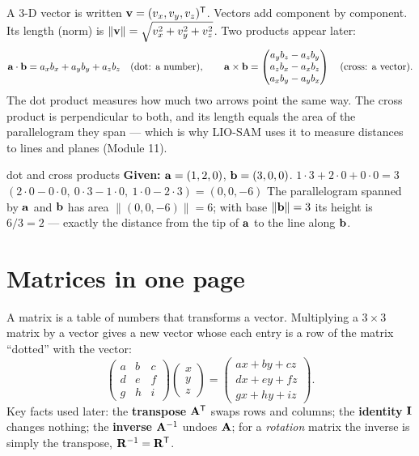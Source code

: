 \begin{eng}
A 3-D vector is written $\mathbf{v}=(v_x,v_y,v_z)^\mathsf{T}$. Vectors add component by component. Its length (norm) is $\|\mathbf{v}\|=\sqrt{v_x^2+v_y^2+v_z^2}$. Two products appear later:
\[ \mathbf{a}\cdot\mathbf{b}=a_xb_x+a_yb_y+a_zb_z \quad(\text{dot: a number}),\qquad
\mathbf{a}\times\mathbf{b}=\begin{pmatrix}a_yb_z-a_zb_y\\ a_zb_x-a_xb_z\\ a_xb_y-a_yb_x\end{pmatrix}\quad(\text{cross: a vector}). \]
The dot product measures how much two arrows point the same way. The cross product is perpendicular to both, and its length equals the area of the parallelogram they span --- which is why LIO-SAM uses it to measure distances to lines and planes (Module 11).
\end{eng}

\begin{worked}{dot and cross products}
\textbf{Given:} $\mathbf{a}=(1,2,0)$, $\mathbf{b}=(3,0,0)$.
 $1\cdot3+2\cdot0+0\cdot0 = 3$
 $(2\cdot0-0\cdot0,\ 0\cdot3-1\cdot0,\ 1\cdot0-2\cdot3)=(0,0,-6)$
 The parallelogram spanned by $\mathbf{a}$ and $\mathbf{b}$ has area $\|(0,0,-6)\|=6$; with base $\|\mathbf{b}\|=3$ its height is $6/3=2$ --- exactly the distance from the tip of $\mathbf{a}$ to the line along $\mathbf{b}$.
\end{worked}

\section{Matrices in one page}
\begin{eng}
A matrix is a table of numbers that transforms a vector. Multiplying a $3\times3$ matrix by a vector gives a new vector whose each entry is a row of the matrix ``dotted'' with the vector:
\[\begin{pmatrix}a&b&c\\d&e&f\\g&h&i\end{pmatrix}\begin{pmatrix}x\\y\\z\end{pmatrix}=\begin{pmatrix}ax+by+cz\\dx+ey+fz\\gx+hy+iz\end{pmatrix}.\]
Key facts used later: the \textbf{transpose} $\mathbf{A}^\mathsf{T}$ swaps rows and columns; the \textbf{identity} $\mathbf{I}$ changes nothing; the \textbf{inverse} $\mathbf{A}^{-1}$ undoes $\mathbf{A}$; for a \emph{rotation} matrix the inverse is simply the transpose, $\mathbf{R}^{-1}=\mathbf{R}^\mathsf{T}$.
\end{eng}

